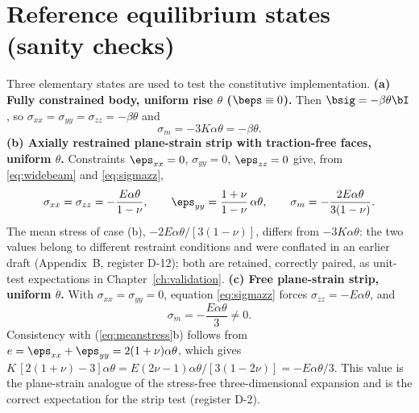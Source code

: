\section{Reference equilibrium states (sanity checks)}
\label{sec:deriv:sanity}
Three elementary states are used to test the constitutive implementation.
\textbf{(a) Fully constrained body, uniform rise $\theta$ ($\beps\equiv0$).} Then
$\bsig=-\beta\theta\bI$, so $\sigma_{xx}=\sigma_{yy}=\sigma_{zz}=-\beta\theta$ and
\begin{equation}
\sigma_m=-3K\alpha\theta=-\beta\theta .
\label{eq:vca1}
\end{equation}
\textbf{(b) Axially restrained plane-strain strip with traction-free faces, uniform $\theta$.}
Constraints $\eps_{xx}=0$, $\sigma_{yy}=0$, $\eps_{zz}=0$ give, from \eqref{eq:widebeam} and
\eqref{eq:sigmazz},
\begin{equation}
\sigma_{xx}=\sigma_{zz}=-\frac{E\alpha\theta}{1-\nu},\qquad
\eps_{yy}=\frac{1+\nu}{1-\nu}\,\alpha\theta,\qquad
\sigma_m=-\frac{2E\alpha\theta}{3(1-\nu)} .
\label{eq:vcb1}
\end{equation}
The mean stress of case (b), $-2E\alpha\theta/[3(1-\nu)]$, differs from $-3K\alpha\theta$: the two
values belong to different restraint conditions and were conflated in an earlier draft (Appendix~B,
register D-12); both are retained, correctly paired, as unit-test expectations in
Chapter~\ref{ch:validation}.
\textbf{(c) Free plane-strain strip, uniform $\theta$.} With
$\sigma_{xx}=\sigma_{yy}=0$, equation \eqref{eq:sigmazz} forces $\sigma_{zz}=-E\alpha\theta$, and
\begin{equation}
\sigma_m=-\frac{E\alpha\theta}{3}\neq0 .
\label{eq:freemean}
\end{equation}
Consistency with (\ref{eq:meanstress}b) follows from
$e=\eps_{xx}+\eps_{yy}=2(1+\nu)\alpha\theta$, which gives
$K\,[2(1+\nu)-3]\alpha\theta=E(2\nu-1)\alpha\theta/[3(1-2\nu)]=-E\alpha\theta/3$.
This value is the plane-strain analogue of the stress-free three-dimensional expansion and is the
correct expectation for the strip test (register D-2).

